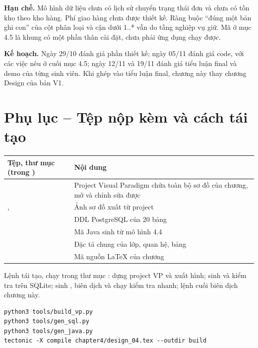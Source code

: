 \documentclass[12pt,a4paper]{article}
\begin{document}
\textbf{Hạn chế.} Mô hình dữ liệu chưa có lịch sử chuyển trạng thái đơn và chưa có tồn kho theo kho
hàng. Phí giao hàng chưa được thiết kế. Ràng buộc ``đúng một bản ghi con'' của cột phân loại và cận dưới
1..* vẫn do tầng nghiệp vụ giữ. Mã ở mục 4.5 là khung có một phần thân cài đặt, chưa phải ứng dụng chạy
được.

\textbf{Kế hoạch.} Ngày 29/10 đánh giá phần thiết kế; ngày 05/11 đánh giá code, với các việc nêu ở cuối
mục 4.5; ngày 12/11 và 19/11 đánh giá tiểu luận final và demo của từng sinh viên. Khi ghép vào tiểu luận
final, chương này thay chương Design của bản V1.

\section*{Phụ lục -- Tệp nộp kèm và cách tái tạo}

\begin{table}[H]
\centering\small
\begin{tabular}{@{}P{5.6cm}P{10.0cm}@{}}
\toprule
Tệp, thư mục (trong ) & Nội dung\\
\midrule
{} & Project Visual Paradigm chứa toàn bộ sơ đồ của chương, mở và chỉnh sửa được\\
,  & Ảnh sơ đồ xuất từ project\\
 & DDL PostgreSQL của 20 bảng\\
 & Mã Java sinh từ mô hình 4.4\\
 & Đặc tả chung của lớp, quan hệ, bảng\\
 & Mã nguồn LaTeX của chương\\
\bottomrule
\end{tabular}
\end{table}

Lệnh tái tạo, chạy trong thư mục :  dựng project VP và xuất
hình;  sinh  và kiểm tra trên SQLite;
 sinh , biên dịch và chạy kiểm tra nhanh; lệnh cuối biên dịch
chương này.
\begin{Verbatim}[fontsize=\small,frame=single]
python3 tools/build_vp.py
python3 tools/gen_sql.py
python3 tools/gen_java.py
tectonic -X compile chapter4/design_04.tex --outdir build
\end{Verbatim}
\end{document}
